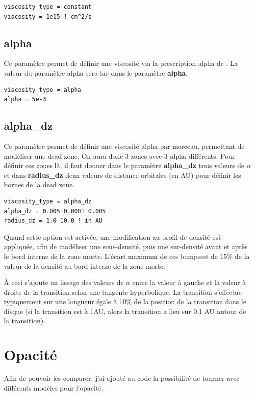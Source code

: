 \begin{verbatim}
viscosity_type = constant
viscosity = 1e15 ! cm^2/s
\end{verbatim}

\subsection{alpha}
Ce paramètre permet de définir une viscosité via la prescription alpha de \cite{shakura1973black}. La valeur du paramètre alpha sera lue dans le paramètre \textbf{alpha}. 

\begin{verbatim}
viscosity_type = alpha
alpha = 5e-3
\end{verbatim}

\subsection{alpha\_dz}\label{sec:dead_zone}
Ce paramètre permet de définir une viscosité alpha par morceau, permettant de modéliser une dead zone. On aura donc 3 zones avec 3 alpha différents. Pour définir ces zones là, il faut donner dans le paramètre \textbf{alpha\_dz} trois valeurs de $\alpha$ et dans \textbf{radius\_dz} deux valeurs de distance orbitales (en AU) pour définir les bornes de la dead zone.
\begin{verbatim}
viscosity_type = alpha_dz
alpha_dz = 0.005 0.0001 0.005
radius_dz = 1.0 10.0 ! in AU
\end{verbatim}

Quand cette option est activée, une modification au profil de densité est appliquée, afin de modéliser une sous-densité, puis une sur-densité avant et après le bord interne de la zone morte. L'écart maximum de ces \og bumps\fg est de 15\% de la valeur de la densité au bord interne de la zone morte. 

À ceci s'ajoute un lissage des valeurs de $\alpha$ entre la valeur à gauche et la valeur à droite de la transition selon une tangente hyperbolique. La transition s'effectue typiquement sur une longueur égale à 10\% de la position de la transition dans le disque (si la transition est à 1AU, alors la transition a lieu sur 0.1 AU autour de la transition).

\section{Opacité}
Afin de pouvoir les comparer, j'ai ajouté au code la possibilité de tourner avec différents modèles pour l'opacité. 

